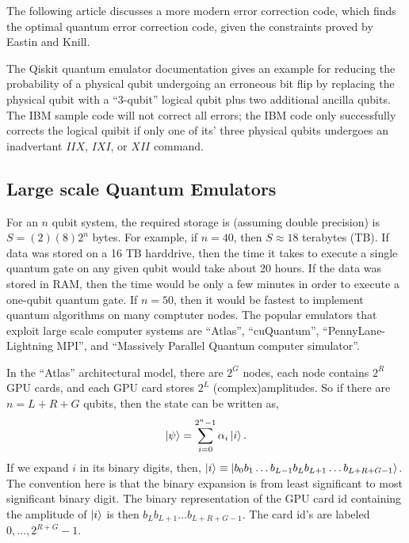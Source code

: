 \documentclass[a4paper,fleqn]{cas-sc}
\begin{document}
The following article discusses a more modern error correction 
code\cite{kubischta2023family}, which finds the optimal quantum
error correction code, given the constraints proved by
Eastin and Knill\cite{eastin2009restrictions}.


The Qiskit quantum emulator documentation\cite{IBM_platform_ECC} gives an
example for reducing the probability of a physical qubit undergoing an
erroneous bit flip by replacing the physical qubit with a ``3-qubit'' 
logical qubit plus two additional ancilla qubits.  The IBM sample code will
not correct all errors; the IBM code
only successfully corrects the logical quibit if only one of its'
three physical qubits undergoes an inadvertant $IIX$, $IXI$, or $XII$
command.

\subsection{Large scale Quantum Emulators}

For an $n$ qubit system, the required storage is (assuming double precision)
is $S=(2)(8)2^{n}$ bytes.  For example, if $n=40$, then 
$S \approx 18$ terabytes (TB).  If data was stored on a 16 TB harddrive,
then the time it takes to execute a single quantum gate on any given
qubit would take about 20 hours.  If the data was stored in RAM, then
the time would be only a few minutes in order to execute a one-qubit quantum
gate.   If $n=50$, then it would be fastest to implement quantum algorithms
on many comptuter nodes.  The popular emulators that exploit large 
scale computer systems are 
``Atlas''\cite{xu2024atlas},
``cuQuantum''\cite{10313722}, 
``PennyLane-Lightning MPI''\cite{kang2025pennylane}, and
``Massively Parallel Quantum computer simulator''\cite{de2019massively}.

In the ``Atlas''\cite{xu2024atlas} architectural model, there are $2^{G}$
nodes, each node contains $2^{R}$ GPU cards, and each GPU card stores
$2^{L}$ (complex)amplitudes.  So if there are $n=L+R+G$ qubits, then the state
can be written as,
\begin{eqnarray*}
\ket{\psi}=\sum_{i=0}^{2^{n}-1}\alpha_{i}\ket{i}.
\end{eqnarray*}
If we expand $i$ in its binary digits, then,
$\ket{i}\equiv\ket{b_{0}b_{1}\ldots b_{L-1}b_{L}b_{L+1}\ldots b_{L+R+G-1}}$.
The convention here is that the binary expansion is from least significant
to most significant binary digit.
The binary representation of the GPU card id containing the amplitude of
$\ket{i}$ is then $b_{L}b_{L+1}\ldots b_{L+R+G-1}$.  The card id's
are labeled $0,\ldots, 2^{R+G}-1$.
\end{document}
